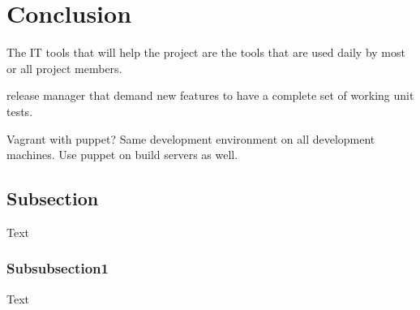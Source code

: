\section{Conclusion}\label{sec:conclusion}
The IT tools that will help the project are the tools that are used daily by most
or all project members.

release manager that demand new features to have a complete set of working
unit tests.

Vagrant with puppet? Same development environment on all development machines.
Use puppet on build servers as well.

\subsection{Subsection}
Text
\subsubsection{Subsubsection1}
Text

